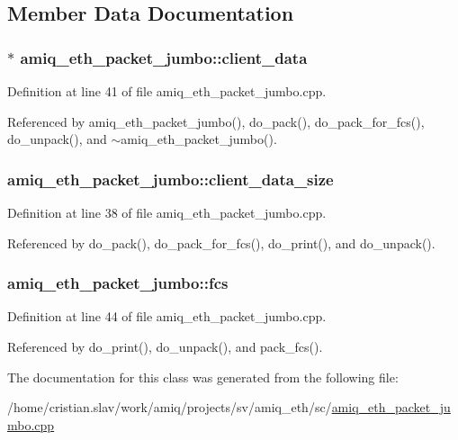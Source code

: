 \subsection{Member Data Documentation}
\hypertarget{classamiq__eth__packet__jumbo_a88160a7a89c8c9cbb8ad2603dfa64c8b}{
\subsubsection[{client\_\-data}]{$\ast$ {\bf amiq\_\-eth\_\-packet\_\-jumbo::client\_\-data}}}
\label{classamiq__eth__packet__jumbo_a88160a7a89c8c9cbb8ad2603dfa64c8b}


Definition at line 41 of file amiq\_\-eth\_\-packet\_\-jumbo.cpp.

Referenced by amiq\_\-eth\_\-packet\_\-jumbo(), do\_\-pack(), do\_\-pack\_\-for\_\-fcs(), do\_\-unpack(), and $\sim$amiq\_\-eth\_\-packet\_\-jumbo().\hypertarget{classamiq__eth__packet__jumbo_ac651c15c773a591d6ea0a84dc2f87c31}{
\subsubsection[{client\_\-data\_\-size}]{ {\bf amiq\_\-eth\_\-packet\_\-jumbo::client\_\-data\_\-size}}}
\label{classamiq__eth__packet__jumbo_ac651c15c773a591d6ea0a84dc2f87c31}


Definition at line 38 of file amiq\_\-eth\_\-packet\_\-jumbo.cpp.

Referenced by do\_\-pack(), do\_\-pack\_\-for\_\-fcs(), do\_\-print(), and do\_\-unpack().\hypertarget{classamiq__eth__packet__jumbo_a64e909b3c1041768d6fabe8bc0d0b634}{
\subsubsection[{fcs}]{ {\bf amiq\_\-eth\_\-packet\_\-jumbo::fcs}}}
\label{classamiq__eth__packet__jumbo_a64e909b3c1041768d6fabe8bc0d0b634}


Definition at line 44 of file amiq\_\-eth\_\-packet\_\-jumbo.cpp.

Referenced by do\_\-print(), do\_\-unpack(), and pack\_\-fcs().

The documentation for this class was generated from the following file:\begin{DoxyCompactItemize}
\item 
/home/cristian.slav/work/amiq/projects/sv/amiq\_\-eth/sc/\hyperlink{amiq__eth__packet__jumbo_8cpp}{amiq\_\-eth\_\-packet\_\-jumbo.cpp}\end{DoxyCompactItemize}
